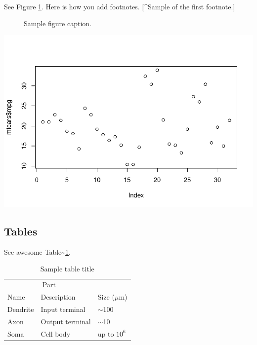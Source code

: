 \documentclass{article}
\newenvironment{Shaded}{\begin{snugshade}}{\end{snugshade}}
\newcommand{\KeywordTok}[1]{\textcolor[rgb]{0.13,0.29,0.53}{\textbf{#1}}}
\newcommand{\NormalTok}[1]{#1}
\newcommand{\OperatorTok}[1]{\textcolor[rgb]{0.81,0.36,0.00}{\textbf{#1}}}
\begin{document}
\lipsum[10]

See Figure \ref{fig:fig1}. Here is how you add footnotes. {[}\^{}Sample
of the first footnote.{]}

\lipsum[11]

\begin{figure}
  \centering
  \fbox{\rule[-.5cm]{4cm}{4cm} \rule[-.5cm]{4cm}{0cm}}
  \caption{Sample figure caption.}
  \label{fig:fig1}
\end{figure}

\begin{Shaded}
\end{Shaded}

\includegraphics{Two-Locus_files/figure-latex/unnamed-chunk-1-1.pdf}

\hypertarget{tables}{%
\subsection{Tables}\label{tables}}

\lipsum[12]

See awesome Table\textasciitilde{}\ref{tab:table}.

\begin{table}
 \caption{Sample table title}
  \centering
  \begin{tabular}{lll}
    \toprule
    \multicolumn{2}{c}{Part}                   \\
    \cmidrule(r){1-2}
    Name     & Description     & Size ($\mu$m) \\
    \midrule
    Dendrite & Input terminal  & $\sim$100     \\
    Axon     & Output terminal & $\sim$10      \\
    Soma     & Cell body       & up to $10^6$  \\
    \bottomrule
  \end{tabular}
  \label{tab:table}
\end{table}
\end{document}
